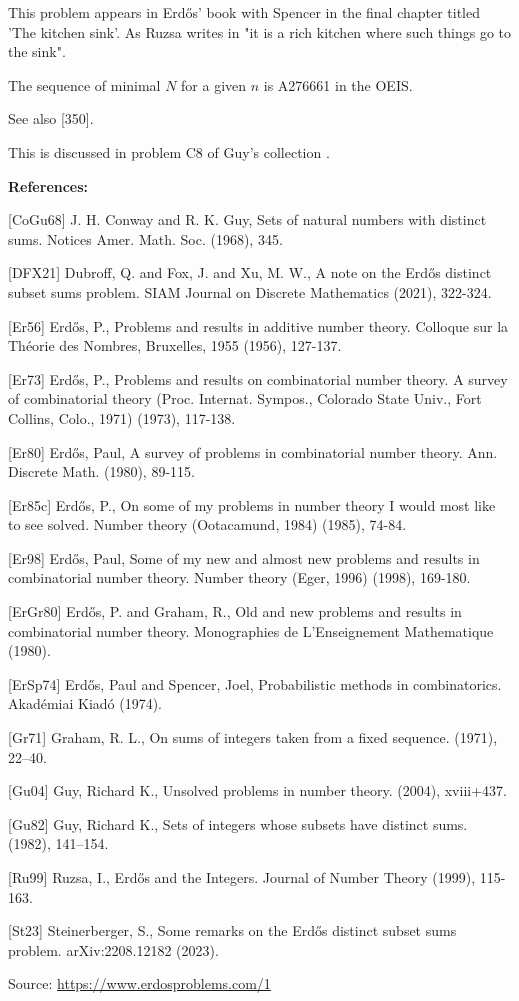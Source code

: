 \documentclass{article}
\begin{document}
This problem appears in Erd\H{o}s' book with Spencer \cite{ErSp74} in the final chapter titled 'The kitchen sink'. As Ruzsa writes in \cite{Ru99} "it is a rich kitchen where such things go to the sink". 

The sequence of minimal $N$ for a given $n$ is A276661 in the OEIS.

See also [350].

This is discussed in problem C8 of Guy's collection \cite{Gu04}.

\bigskip
\noindent\textbf{References:}

[CoGu68] J. H. Conway and R. K. Guy, Sets of natural numbers with distinct sums. Notices Amer. Math. Soc. (1968), 345.
 
 [DFX21] Dubroff, Q. and Fox, J. and Xu, M. W., A note on the Erd\H{o}s distinct subset sums problem. SIAM Journal on Discrete Mathematics (2021), 322-324.
 
 [Er56] Erd\H{o}s, P., Problems and results in additive number theory. Colloque sur la Th\'{e}orie des Nombres, Bruxelles, 1955 (1956), 127-137.
 
 [Er73] Erd\H{o}s, P., Problems and results on combinatorial number theory. A survey of combinatorial theory (Proc. Internat. Sympos., Colorado State Univ., Fort Collins, Colo., 1971) (1973), 117-138.
 
 [Er80] Erd\H{o}s, Paul, A survey of problems in combinatorial number theory. Ann. Discrete Math. (1980), 89-115.
 
 [Er85c] Erd\H{o}s, P., On some of my problems in number theory I would most like to see solved. Number theory (Ootacamund, 1984) (1985), 74-84.
 
 [Er98] Erd\H{o}s, Paul, Some of my new and almost new problems and results in combinatorial number theory. Number theory (Eger, 1996) (1998), 169-180.
 
 [ErGr80] Erd\H{o}s, P. and Graham, R., Old and new problems and results in combinatorial number theory. Monographies de L'Enseignement Mathematique (1980).
 
 [ErSp74] Erd\H{o}s, Paul and Spencer, Joel, Probabilistic methods in combinatorics. Akad\'{e}miai Kiad\'{o} (1974).
 
 [Gr71] Graham, R. L., On sums of integers taken from a fixed sequence. (1971), 22--40.
 
 [Gu04] Guy, Richard K., Unsolved problems in number theory. (2004), xviii+437.
 
 [Gu82] Guy, Richard K., Sets of integers whose subsets have distinct sums. (1982), 141--154.
 
 [Ru99] Ruzsa, I., Erd\H{o}s and the Integers. Journal of Number Theory (1999), 115-163.
 
 [St23] Steinerberger, S., Some remarks on the Erd\H{o}s distinct subset sums problem. arXiv:2208.12182 (2023).

\bigskip
\noindent\small{Source: \url{https://www.erdosproblems.com/1}}
\end{document}

